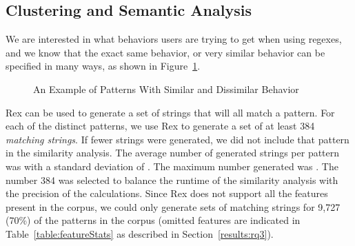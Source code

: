 
\subsection{Clustering and Semantic Analysis}
We are interested in what behaviors users are trying to get when using regexes, and we know that the exact same behavior, or very similar behavior can be specified in many ways, as shown in Figure~\ref{fig:equivalentPatterns}. 

\begin{figure}[tb]
\centering
{}
\caption{An Example of Patterns With Similar and Dissimilar Behavior}
\label{fig:equivalentPatterns}
\end{figure}

Rex can be used to generate a set of strings that will all match a pattern.  For each of the  distinct patterns, we use Rex to generate a set of at least 384 \emph{matching strings}. If fewer strings were generated, we did not include that pattern in the similarity analysis. The average number of generated strings per pattern was  with a standard deviation of . The maximum number generated was .  The number 384 was selected to balance the runtime of the similarity analysis with the precision of the calculations. Since Rex does not support all the features present in the corpus, we could only generate sets of matching strings for 9,727 (70\%) of the  patterns in the corpus (omitted features are indicated in Table~\ref{table:featureStats} as described in Section~\ref{results:rq3}).

